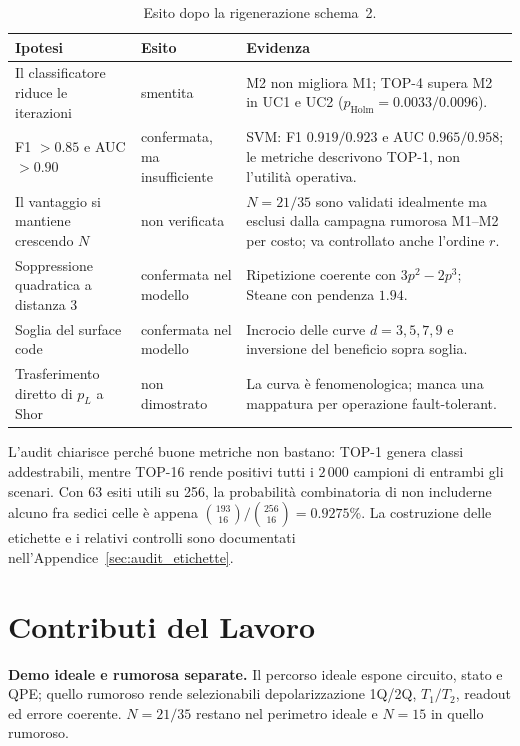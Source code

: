 \begin{onehalfspace}
\begin{table}[H]
\centering
\footnotesize
\setlength{\tabcolsep}{4pt}
\caption[Esito delle ipotesi]{Esito dopo la rigenerazione schema~2.}
\label{tab:esito_ipotesi}
\begin{tabular}{p{3.8cm}p{2.2cm}p{7.2cm}}
\toprule
\textbf{Ipotesi} & \textbf{Esito} & \textbf{Evidenza} \\
\midrule
Il classificatore riduce le iterazioni
& smentita
& M2 non migliora M1; TOP-4 supera M2 in UC1 e UC2
($p_{\mathrm{Holm}}=0.0033/0.0096$). \\
\addlinespace
F1 $>0.85$ e AUC $>0.90$
& confermata, ma insufficiente
& SVM: F1 $0.919/0.923$ e AUC $0.965/0.958$; le metriche descrivono TOP-1,
non l'utilità operativa. \\
\addlinespace
Il vantaggio si mantiene crescendo $N$
& non verificata
& $N=21/35$ sono validati idealmente ma esclusi dalla campagna rumorosa
M1--M2 per costo; va
controllato anche l'ordine $r$. \\
\addlinespace
Soppressione quadratica a distanza 3
& confermata nel modello
& Ripetizione coerente con $3p^2-2p^3$; Steane con pendenza $1.94$. \\
\addlinespace
Soglia del surface code
& confermata nel modello
& Incrocio delle curve $d=3,5,7,9$ e inversione del beneficio sopra soglia. \\
\addlinespace
Trasferimento diretto di $p_L$ a Shor
& non dimostrato
& La curva è fenomenologica; manca una mappatura per operazione
fault-tolerant. \\
\bottomrule
\end{tabular}
\end{table}

L'audit chiarisce perché buone metriche non bastano: TOP-1 genera classi
addestrabili, mentre TOP-16 rende positivi tutti i $2\,000$ campioni di entrambi
gli scenari. Con 63 esiti utili su 256, la probabilità combinatoria di non
includerne alcuno fra sedici celle è appena
$\binom{193}{16}/\binom{256}{16}=0.9275\%$. La costruzione delle etichette e i
relativi controlli sono documentati nell'Appendice~\ref{sec:audit_etichette}.

\section{Contributi del Lavoro}

\textbf{Demo ideale e rumorosa separate.}
Il percorso ideale espone circuito, stato e QPE; quello rumoroso rende
selezionabili depolarizzazione 1Q/2Q, $T_1/T_2$, readout ed errore coerente.
$N=21/35$ restano nel perimetro ideale e $N=15$ in quello rumoroso.


\end{onehalfspace}
